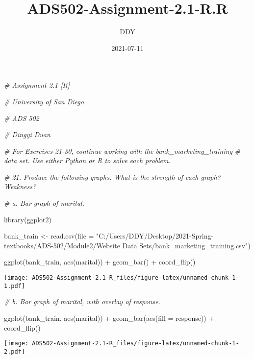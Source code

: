 \documentclass[
]{article}
\title{ADS502-Assignment-2.1-R.R}
\author{DDY}
\date{2021-07-11}
\newenvironment{Shaded}{\begin{snugshade}}{\end{snugshade}}
\newcommand{\AttributeTok}[1]{\textcolor[rgb]{0.77,0.63,0.00}{#1}}
\newcommand{\CommentTok}[1]{\textcolor[rgb]{0.56,0.35,0.01}{\textit{#1}}}
\newcommand{\FunctionTok}[1]{\textcolor[rgb]{0.00,0.00,0.00}{#1}}
\newcommand{\NormalTok}[1]{#1}
\newcommand{\OtherTok}[1]{\textcolor[rgb]{0.56,0.35,0.01}{#1}}
\newcommand{\SpecialCharTok}[1]{\textcolor[rgb]{0.00,0.00,0.00}{#1}}
\newcommand{\StringTok}[1]{\textcolor[rgb]{0.31,0.60,0.02}{#1}}
\begin{document}
\maketitle

\begin{Shaded}
\begin{Highlighting}[]
\CommentTok{\# Assignment 2.1 [R]}

\CommentTok{\# University of San Diego}

\CommentTok{\# ADS 502}

\CommentTok{\# Dingyi Duan}


\CommentTok{\# For Exercises 21{-}30, continue working with the bank\_marketing\_training }
\CommentTok{\# data set. Use either Python or R to solve each problem.}

\CommentTok{\# 21. Produce the following graphs. What is the strength of each graph? Weakness?}

\CommentTok{\# a. Bar graph of marital.}

\FunctionTok{library}\NormalTok{(ggplot2)}

\NormalTok{bank\_train }\OtherTok{\textless{}{-}} \FunctionTok{read.csv}\NormalTok{(}\AttributeTok{file =} \StringTok{"C:/Users/DDY/Desktop/2021{-}Spring{-}textbooks/ADS{-}502/Module2/Website Data Sets/bank\_marketing\_training.csv"}\NormalTok{)}

\FunctionTok{ggplot}\NormalTok{(bank\_train, }\FunctionTok{aes}\NormalTok{(marital)) }\SpecialCharTok{+} \FunctionTok{geom\_bar}\NormalTok{() }\SpecialCharTok{+} \FunctionTok{coord\_flip}\NormalTok{()}
\end{Highlighting}
\end{Shaded}

\texttt{[image: ADS502-Assignment-2.1-R\_files/figure-latex/unnamed-chunk-1-1.pdf]}

\begin{Shaded}
\begin{Highlighting}[]
\CommentTok{\# b. Bar graph of marital, with overlay of response.}

\FunctionTok{ggplot}\NormalTok{(bank\_train, }\FunctionTok{aes}\NormalTok{(marital)) }\SpecialCharTok{+} \FunctionTok{geom\_bar}\NormalTok{(}\FunctionTok{aes}\NormalTok{(}\AttributeTok{fill =}\NormalTok{ response)) }\SpecialCharTok{+} \FunctionTok{coord\_flip}\NormalTok{()}
\end{Highlighting}
\end{Shaded}

\texttt{[image: ADS502-Assignment-2.1-R\_files/figure-latex/unnamed-chunk-1-2.pdf]}
\end{document}
